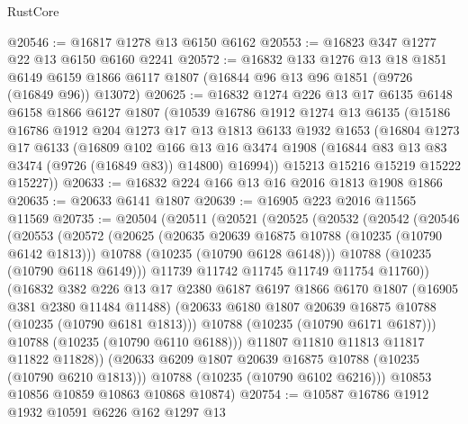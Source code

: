 \begin{lexlean}{RustCore}
\begin{coremodule}
@20546 := @16817 @1278 @13 @6150 @6162
@20553 := @16823 @347 @1277 @22 @13 @6150 @6160 @2241
@20572 := @16832
    @133
    @1276
    @13
    @18
    @1851
    @6149
    @6159
    @1866
    @6117
    @1807
    (@16844 @96 @13 @96 @1851 (@9726 (@16849 @96)) @13072)
@20625 := @16832
    @1274
    @226
    @13
    @17
    @6135
    @6148
    @6158
    @1866
    @6127
    @1807
    (@10539
      @16786
      @1912
      @1274
      @13
      @6135
      (@15186
        @16786
        @1912
        @204
        @1273
        @17
        @13
        @1813
        @6133
        @1932
        @1653
        (@16804
          @1273
          @17
          @6133
          (@16809
            @102
            @166
            @13
            @16
            @3474
            @1908
            (@16844 @83 @13 @83 @3474 (@9726 (@16849 @83)) @14800)
            @16994))
        @15213
        @15216
        @15219
        @15222
        @15227))
@20633 := @16832 @224 @166 @13 @16 @2016 @1813 @1908 @1866
@20635 := @20633 @6141 @1807
@20639 := @16905 @223 @2016 @11565 @11569
@20735 := @20504
    (@20511
      (@20521
        (@20525
          (@20532
            (@20542
              (@20546
                (@20553
                  (@20572
                    (@20625
                      (@20635 @20639 @16875 @10788 (@10235 (@10790 @6142 @1813)))
                      @10788
                      (@10235 (@10790 @6128 @6148)))
                    @10788
                    (@10235 (@10790 @6118 @6149)))
                  @11739
                  @11742
                  @11745
                  @11749
                  @11754
                  @11760))
              (@16832
                @382
                @226
                @13
                @17
                @2380
                @6187
                @6197
                @1866
                @6170
                @1807
                (@16905 @381 @2380 @11484 @11488)
                (@20633 @6180 @1807 @20639 @16875 @10788 (@10235 (@10790 @6181 @1813)))
                @10788
                (@10235 (@10790 @6171 @6187)))
              @10788
              (@10235 (@10790 @6110 @6188)))
            @11807
            @11810
            @11813
            @11817
            @11822
            @11828))
        (@20633 @6209 @1807 @20639 @16875 @10788 (@10235 (@10790 @6210 @1813)))
        @10788
        (@10235 (@10790 @6102 @6216)))
      @10853
      @10856
      @10859
      @10863
      @10868
      @10874)
@20754 := @10587
    @16786
    @1912
    @1932
    @10591
    @6226
    @162
    @1297
    @13

\end{coremodule}
\end{lexlean}
